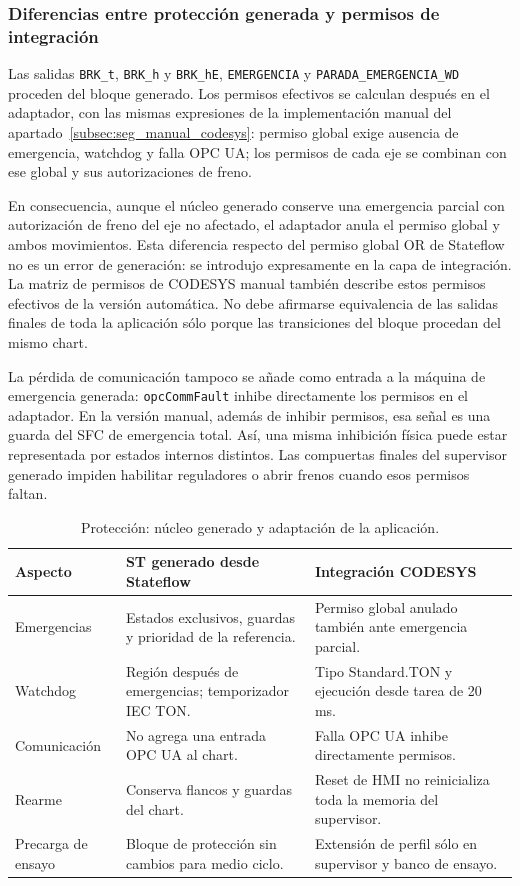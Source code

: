 \documentclass[a4paper,10pt,onecolumn,journal]{ieeeconf}
\numberwithin{equation}{section}
\begin{document}

\subsubsection{Diferencias entre protección generada y permisos de integración}
Las salidas \texttt{BRK\_t}, \texttt{BRK\_h} y \texttt{BRK\_hE}, \texttt{EMERGENCIA} y \texttt{PARADA\_EMERGENCIA\_WD} proceden del bloque generado. Los permisos efectivos se calculan después en el adaptador, con las mismas expresiones de la implementación manual del apartado~\ref{subsec:seg_manual_codesys}: permiso global exige ausencia de emergencia, watchdog y falla OPC UA; los permisos de cada eje se combinan con ese global y sus autorizaciones de freno.

En consecuencia, aunque el núcleo generado conserve una emergencia parcial con autorización de freno del eje no afectado, el adaptador anula el permiso global y ambos movimientos. Esta diferencia respecto del permiso global OR de Stateflow no es un error de generación: se introdujo expresamente en la capa de integración. La matriz de permisos de CODESYS manual también describe estos permisos efectivos de la versión automática. No debe afirmarse equivalencia de las salidas finales de toda la aplicación sólo porque las transiciones del bloque procedan del mismo chart.

La pérdida de comunicación tampoco se añade como entrada a la máquina de emergencia generada: \texttt{opcCommFault} inhibe directamente los permisos en el adaptador. En la versión manual, además de inhibir permisos, esa señal es una guarda del SFC de emergencia total. Así, una misma inhibición física puede estar representada por estados internos distintos. Las compuertas finales del supervisor generado impiden habilitar reguladores o abrir frenos cuando esos permisos faltan.

\begin{table}[!htb]
\centering\footnotesize
\caption{Protección: núcleo generado y adaptación de la aplicación.}\label{tab:seguridad_auto_capas}
\begin{tabular}{L{3.6cm} L{5.5cm} L{5.5cm}}
\toprule
Aspecto & ST generado desde Stateflow & Integración CODESYS\\
\midrule
Emergencias & Estados exclusivos, guardas y prioridad de la referencia. & Permiso global anulado también ante emergencia parcial.\\
Watchdog & Región después de emergencias; temporizador IEC TON. & Tipo Standard.TON y ejecución desde tarea de 20 ms.\\
Comunicación & No agrega una entrada OPC UA al chart. & Falla OPC UA inhibe directamente permisos.\\
Rearme & Conserva flancos y guardas del chart. & Reset de HMI no reinicializa toda la memoria del supervisor.\\
Precarga de ensayo & Bloque de protección sin cambios para medio ciclo. & Extensión de perfil sólo en supervisor y banco de ensayo.\\
\bottomrule
\end{tabular}
\end{table}
\end{document}
